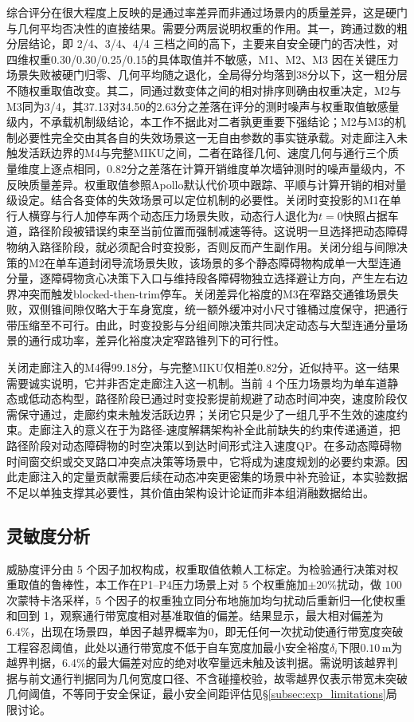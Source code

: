 \documentclass[a4paper,11pt]{ctexart}
\theoremstyle{definition}
\begin{document}
综合评分在很大程度上反映的是通过率差异而非通过场景内的质量差异，这是硬门与几何平均否决性的直接结果。需要分两层说明权重的作用。其一，跨通过数的粗分层结论，即 2/4、3/4、4/4 三档之间的高下，主要来自安全硬门的否决性，对四维权重0.30/0.30/0.25/0.15的具体取值并不敏感，M1、M2、M3 因在关键压力场景失败被硬门归零、几何平均随之退化，全局得分均落到38分以下，这一粗分层不随权重取值改变。其二，同通过数变体之间的相对排序则确由权重决定，M2与M3同为3/4，其37.13对34.50的2.63分之差落在评分的测时噪声与权重取值敏感量级内，不承载机制级结论，本工作不据此对二者孰更重要下强结论；M2与M3的机制必要性完全交由其各自的失效场景这一无自由参数的事实链承载。对走廊注入未触发活跃边界的M4与完整MIKU之间，二者在路径几何、速度几何与通行三个质量维度上逐点相同，0.82分之差落在计算开销维度单次墙钟测时的噪声量级内，不反映质量差异。权重取值参照Apollo默认代价项中跟踪、平顺与计算开销的相对量级设定。结合各变体的失效场景可以定位机制的必要性。关闭时变投影的M1在单行人横穿与行人加停车两个动态压力场景失败，动态行人退化为$t=0$快照占据车道，路径阶段被错误约束至当前位置而强制减速等待。这说明一旦选择把动态障碍物纳入路径阶段，就必须配合时变投影，否则反而产生副作用。关闭分组与间隙决策的M2在单车道封闭导流场景失败，该场景的多个静态障碍物构成单一大型连通分量，逐障碍物贪心决策下入口与维持段各障碍物独立选择避让方向，产生左右边界冲突而触发blocked-then-trim停车。关闭差异化裕度的M3在窄路交通锥场景失败，双侧锥间隙仅略大于车身宽度，统一额外缓冲对小尺寸锥桶过度保守，把通行带压缩至不可行。由此，时变投影与分组间隙决策共同决定动态与大型连通分量场景的通行成功率，差异化裕度决定窄路锥列下的可行性。

关闭走廊注入的M4得99.18分，与完整MIKU仅相差0.82分，近似持平。这一结果需要诚实说明，它并非否定走廊注入这一机制。当前 4 个压力场景均为单车道静态或低动态构型，路径阶段已通过时变投影提前规避了动态时间冲突，速度阶段仅需保守通过，走廊约束未触发活跃边界；关闭它只是少了一组几乎不生效的速度约束。走廊注入的意义在于为路径-速度解耦架构补全此前缺失的约束传递通道，把路径阶段对动态障碍物的时空决策以到达时间形式注入速度QP。在多动态障碍物时间窗交织或交叉路口冲突点决策等场景中，它将成为速度规划的必要约束源。因此走廊注入的定量贡献需要后续在动态冲突更密集的场景中补充验证，本实验数据不足以单独支撑其必要性，其价值由架构设计论证而非本组消融数据给出。

\subsection{灵敏度分析}
\label{subsec:exp_sensitivity}

威胁度评分由 5 个因子加权构成，权重取值依赖人工标定。为检验通行决策对权重取值的鲁棒性，本工作在P1--P4压力场景上对 5 个权重施加$\pm 20\%$扰动，做 100 次蒙特卡洛采样，5 个因子的权重独立同分布地施加均匀扰动后重新归一化使权重和回到 1，观察通行带宽度相对基准取值的偏差。结果显示，最大相对偏差为6.4\%，出现在场景四，单因子越界概率为0，即无任何一次扰动使通行带宽度突破工程容忍阈值，此处以通行带宽度不低于自车宽度加最小安全裕度$\delta_i$下限$0.10$\,m为越界判据，6.4\%的最大偏差对应的绝对收窄量远未触及该判据。需说明该越界判据与前文通行判据同为几何宽度口径、不含碰撞校验，故零越界仅表示带宽未突破几何阈值，不等同于安全保证，最小安全间距评估见§\ref{subsec:exp_limitations}局限讨论。
\end{document}
